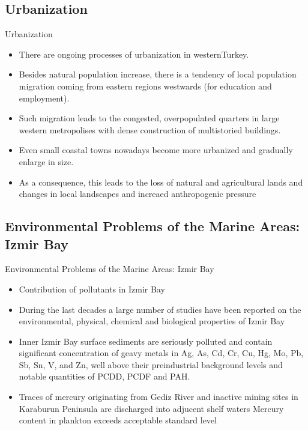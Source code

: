 \documentclass[pdflatex,compress,9pt,
	xcolor={dvipsnames,dvipsnames,svgnames,x11names,table},
	hyperref={colorlinks = true,breaklinks = true, urlcolor = NavyBlue, breaklinks = true}]{beamer}
\begin{document}
\subsection{Urbanization}
\begin{frame}{Urbanization}
\begin{itemize}
            \item There are ongoing processes of urbanization in westernTurkey.
            \item Besides natural population increase, there is a tendency of local population migration coming from eastern regions westwards (for education and employment). 
            \item Such migration leads to the congested, overpopulated quarters in large western metropolises with dense construction of multistoried buildings.
            \item Even small coastal towns nowadays become more urbanized and gradually enlarge in size. 
            \item As a consequence, this leads to the loss of natural and agricultural lands and changes in local landscapes and increaed anthropogenic pressure
\end{itemize}
\end{frame}


\subsection{Environmental Problems of the Marine Areas: Izmir Bay}
\begin{frame}{Environmental Problems of the Marine Areas: Izmir Bay}
\begin{itemize}
         \item Contribution of pollutants in Izmir Bay
	\item During the last decades a large number of studies have been reported on the environmental, physical, chemical and biological properties of Izmir Bay
	\item Inner Izmir Bay surface sediments are seriously polluted and contain significant concentration of geavy metals in Ag, As, Cd, Cr, Cu, Hg, Mo, Pb, Sb, Sn, V, and Zn, well above their preindustrial background levels and notable quantities of PCDD, PCDF and PAH. 
	\item Traces of mercury originating from Gediz River and inactive mining sites in Karaburun Peninsula are discharged into adjucent shelf waters
Mercury content in plankton exceeds acceptable standard level
\end{itemize}
\end{frame}
\end{document}
